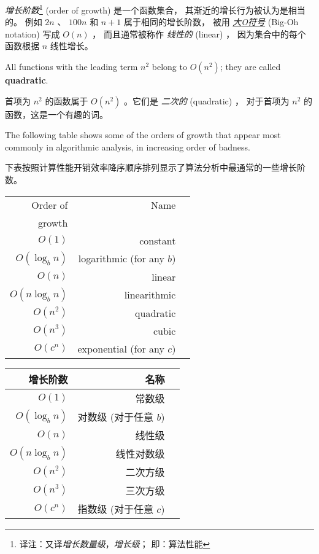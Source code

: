 {\em 增长阶数}\footnote{译注：又译{\em 增长数量级}，{\em 增长级}； 即：算法性能} (order of growth) 是一个函数集合， 其渐近的增长行为被认为是相当的。
例如 $2n$ 、 $100n$ 和 $n+1$ 属于相同的增长阶数，
被用 \href{https://zh.wikipedia.org/wiki/%E5%A4%A7O%E7%AC%A6%E5%8F%B7}{{\em 大{\em O}符号}} (Big-Oh notation) 写成 $O(n)$ ，
而且通常被称作 {\em 线性的} (linear) ，
因为集合中的每个函数根据 $n$ 线性增长。
  

All functions with the leading term $n^2$ belong to $O(n^2)$; they are
called {\bf quadratic}.

首项为 $n^2$ 的函数属于 $O(n^2)$ 。它们是 {\em 二次的} (quadratic) ，
对于首项为 $n^2$ 的函数，这是一个有趣的词。

The following table shows some of the orders of growth that
appear most commonly in algorithmic analysis,
in increasing order of badness.

下表按照计算性能开销效率降序顺序排列显示了算法分析中最通常的一些增长阶数。

\begin{tabular}{|r|r|r|}
\hline
Order of     &   Name      \\
growth       &               \\
\hline
$O(1)$             & constant \\
$O(\log_b n)$      & logarithmic (for any $b$) \\
$O(n)$             & linear \\
$O(n \log_b n)$    & linearithmic \\
$O(n^2)$           & quadratic     \\
$O(n^3)$           & cubic     \\
$O(c^n)$           & exponential (for any $c$)    \\
\hline
\end{tabular}

\begin{tabular}{|r|r|r|}
\hline
增长阶数     &   名称      \\
\hline
$O(1)$             & 常数级 \\
$O(\log_b n)$      & 对数级 (对于任意 $b$) \\
$O(n)$             & 线性级 \\
$O(n \log_b n)$    & 线性对数级 \\
$O(n^2)$           & 二次方级     \\
$O(n^3)$           & 三次方级     \\
$O(c^n)$           & 指数级 (对于任意 $c$)    \\
\hline
\end{tabular}

